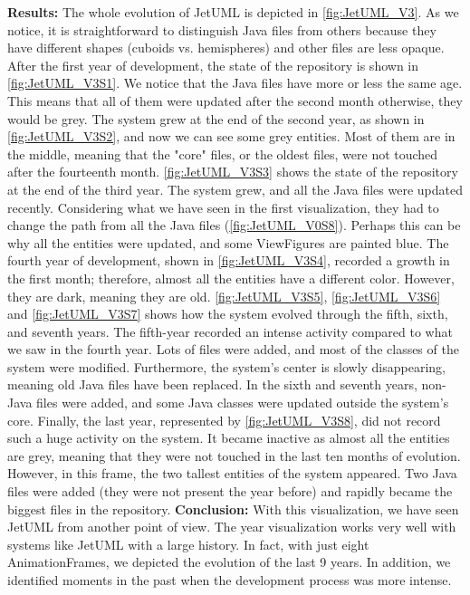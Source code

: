 \textbf{Results:}
The whole evolution of JetUML is depicted in \autoref{fig:JetUML_V3}. As we notice, it is straightforward to distinguish Java files from others because they have different shapes (cuboids vs. hemispheres)  and other files are less opaque. After the first year of development, the state of the repository is shown in \autoref{fig:JetUML_V3S1}. We notice that the Java files have more or less the same age. This means that all of them were updated after the second month otherwise, they would be grey. The system grew at the end of the second year, as shown in \autoref{fig:JetUML_V3S2}, and now we can see some grey entities. Most of them are in the middle, meaning that the "core" files, or the oldest files, were not touched after the fourteenth month.  \autoref{fig:JetUML_V3S3} shows the state of the repository at the end of the third year. The system grew, and all the Java files were updated recently. Considering what we have seen in the first visualization, they had to change the path from all the Java files (\autoref{fig:JetUML_V0S8}). Perhaps this can be why all the entities were updated, and some ViewFigures are painted blue. 
The fourth year of development, shown in  \autoref{fig:JetUML_V3S4}, recorded a growth in the first month; therefore, almost all the entities have a different color.
However, they are dark, meaning they are old. 
\autoref{fig:JetUML_V3S5},  \autoref{fig:JetUML_V3S6} and  \autoref{fig:JetUML_V3S7} shows how the system evolved through the fifth, sixth, and seventh years. The fifth-year recorded an intense activity compared to what we saw in the fourth year. Lots of files were added, and most of the classes of the system were modified. Furthermore, the system's center is slowly disappearing, meaning old Java files have been replaced. In the sixth and seventh years, non-Java files were added, and some Java classes were updated outside the system's core. Finally, the last year, represented by \autoref{fig:JetUML_V3S8}, did not record such a huge activity on the system. It became inactive as almost all the entities are grey, meaning that they were not touched in the last ten months of evolution. However, in this frame, the two tallest entities of the system appeared. Two Java files were added (they were not present the year before) and rapidly became the biggest files in the repository.  
\bigbreak
\textbf{Conclusion:}
With this visualization, we have seen JetUML from another point of view. The year visualization works very well with systems like JetUML with a large history. In fact, with just eight AnimationFrames, we depicted the evolution of the last 9 years. In addition, we identified moments in the past when the development process was more intense. 
\bigbreak

